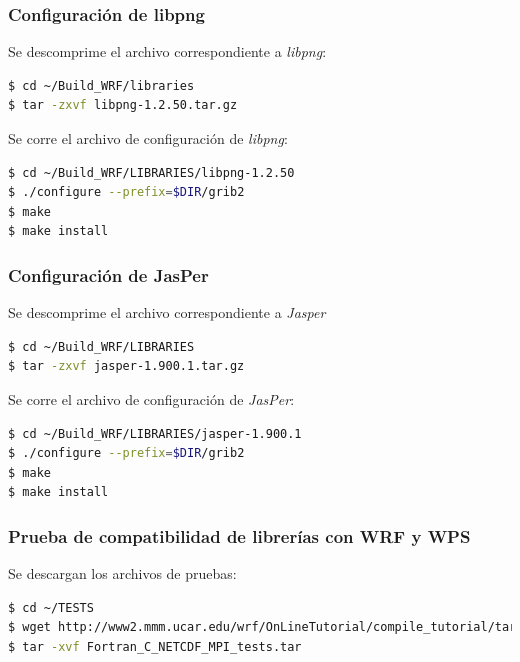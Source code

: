\documentclass[12pt,letter]{article}
\begin{document}
\subsubsection*{Configuraci\'on de libpng}

Se descomprime el archivo correspondiente a \textit{libpng}:
\begin{lstlisting}[language=bash]
$ cd ~/Build_WRF/libraries
$ tar -zxvf libpng-1.2.50.tar.gz
\end{lstlisting}

\noindent Se corre el archivo de configuraci\'on de \textit{libpng}:
\begin{lstlisting}[language=bash]
$ cd ~/Build_WRF/LIBRARIES/libpng-1.2.50
$ ./configure --prefix=$DIR/grib2
$ make
$ make install

\end{lstlisting}

\subsubsection*{Configuraci\'on de JasPer}
Se descomprime el archivo correspondiente a \textit{Jasper}

\begin{lstlisting}[language=bash]
$ cd ~/Build_WRF/LIBRARIES
$ tar -zxvf jasper-1.900.1.tar.gz
\end{lstlisting}

\noindent Se corre el archivo de configuraci\'on de \textit{JasPer}:
\begin{lstlisting}[language=bash]
$ cd ~/Build_WRF/LIBRARIES/jasper-1.900.1
$ ./configure --prefix=$DIR/grib2
$ make
$ make install
\end{lstlisting}

\subsubsection*{Prueba de compatibilidad de librer\'ias con WRF y WPS}
Se descargan los archivos de pruebas:
\begin{lstlisting}[language=bash]
$ cd ~/TESTS
$ wget http://www2.mmm.ucar.edu/wrf/OnLineTutorial/compile_tutorial/tar_files/Fortran_C_NETCDF_MPI_tests.tar
$ tar -xvf Fortran_C_NETCDF_MPI_tests.tar
\end{lstlisting}
\end{document}

